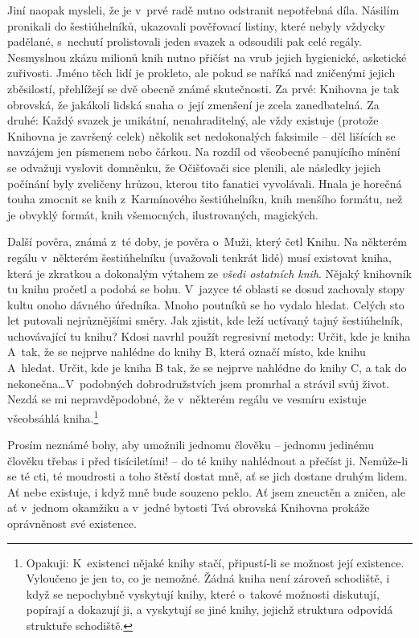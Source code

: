 \documentclass[11pt]{article}
\begin{document}
Jiní naopak mysleli, že je v~prvé radě nutno odstranit nepotřebná díla. Násilím pronikali do šestiúhelníků, ukazovali pověřovací listiny, které nebyly vždycky padělané, s~nechutí prolistovali jeden svazek a odsoudili pak celé regály. Nesmyslnou zkázu milionů knih nutno přičíst na vrub jejich hygienické, asketické zuřivosti. Jméno těch lidí je prokleto, ale pokud se naříká nad  zničenými jejich zběsilostí, přehlížejí se dvě obecně známé skutečnosti. Za prvé: Knihovna je tak obrovská, že jakákoli lidská snaha o~její zmenšení je zcela zanedbatelná. Za druhé: Každý svazek je unikátní, nenahraditelný, ale vždy existuje (protože Knihovna je završený celek) několik set nedokonalých faksimile -- děl lišících se navzájem jen písmenem nebo čárkou. Na rozdíl od všeobecné panujícího mínění se odvažuji vyslovit domněnku, že Očišťovači sice plenili, ale následky jejich počínání byly zveličeny hrůzou, kterou tito fanatici vyvolávali. Hnala je horečná touha zmocnit se knih z~Karmínového šestiúhelníku, knih menšího formátu, než je obvyklý formát, knih všemocných, ilustrovaných, magických.

Další pověra, známá z~té doby, je pověra o~Muži, který četl Knihu. Na některém regálu v~některém šestiúhelníku (uvažovali tenkrát lidé) musí existovat kniha, která je zkratkou a dokonalým výtahem ze \textit{všedi ostatních knih}. Nějaký knihovník tu knihu pročetl a podobá se bohu. V~jazyce té oblasti se dosud zachovaly stopy kultu onoho dávného úředníka. Mnoho poutníků se ho vydalo hledat. Celých sto let putovali nejrůznějšími směry. Jak zjistit, kde leží uctívaný tajný šestiúhelník, uchovávající tu knihu? Kdosi navrhl použít regresivní metody: Určit, kde je kniha A~tak, že se nejprve nahlédne do knihy B, která označí místo, kde knihu A~hledat. Určit, kde je kniha B tak, že se nejprve nahlédne do knihy C, a tak do nekonečna\dots V~podobných dobrodružstvích jsem promrhal a strávil svůj život. Nezdá se mi nepravděpodobné, že v~některém regálu ve vesmíru existuje všeobsáhlá kniha.\footnote{Opakuji: K~existenci nějaké knihy stačí, připustí-li se možnost její existence. Vyloučeno je jen to, co je nemožné. Žádná kniha není zároveň schodiště, i když se nepochybně vyskytují knihy, které o~takové možnosti diskutují, popírají a dokazují ji, a vyskytují se jiné knihy, jejichž struktura odpovídá struktuře schodiště.}

Prosím neznámé bohy, aby umožnili jednomu člověku -- jednomu jedinému člověku třebas i před tisíciletími! -- do té knihy nahlédnout a přečíst ji. Nemůže-li se té cti, té moudrosti a toho štěstí dostat mně, ať se jich dostane druhým lidem. Ať nebe existuje, i když mně bude souzeno peklo. Ať jsem zneuctěn a zničen, ale ať v~jednom okamžiku a v~jedné bytosti Tvá obrovská Knihovna prokáže oprávněnost své existence.
\end{document}
